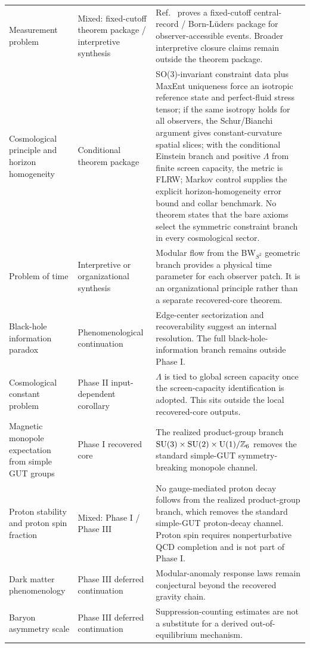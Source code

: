 \begin{longtable}{p{} p{} p{}}
Measurement problem & Mixed: fixed-cutoff theorem package / interpretive synthesis & Ref.~\cite{ophmicrophysics} proves a fixed-cutoff central-record / Born-L\"uders package for observer-accessible events. Broader interpretive closure claims remain outside the theorem package. \\
Cosmological principle and horizon homogeneity & Conditional theorem package & SO(3)-invariant constraint data plus MaxEnt uniqueness force an isotropic reference state and perfect-fluid stress tensor; if the same isotropy holds for all observers, the Schur/Bianchi argument gives constant-curvature spatial slices; with the conditional Einstein branch and positive \(\Lambda\) from finite screen capacity, the metric is FLRW; Markov control supplies the explicit horizon-homogeneity error bound and collar benchmark. No theorem states that the bare axioms select the symmetric constraint branch in every cosmological sector. \\
Problem of time & Interpretive or organizational synthesis & Modular flow from the BW\(_{S^2}\) geometric branch provides a physical time parameter for each observer patch. It is an organizational principle rather than a separate recovered-core theorem. \\
Black-hole information paradox & Phenomenological continuation & Edge-center sectorization and recoverability suggest an internal resolution. The full black-hole-information branch remains outside Phase I. \\
Cosmological constant problem & Phase II input-dependent corollary & \(\Lambda\) is tied to global screen capacity once the screen-capacity identification is adopted. This sits outside the local recovered-core outputs. \\
Magnetic monopole expectation from simple GUT groups & Phase I recovered core & The realized product-group branch \(\mathrm{SU}(3)\times\mathrm{SU}(2)\times\mathrm{U}(1)/\mathbb Z_6\) removes the standard simple-GUT symmetry-breaking monopole channel. \\
Proton stability and proton spin fraction & Mixed: Phase I / Phase III & No gauge-mediated proton decay follows from the realized product-group branch, which removes the standard simple-GUT proton-decay channel. Proton spin requires nonperturbative QCD completion and is not part of Phase I. \\
Dark matter phenomenology & Phase III deferred continuation & Modular-anomaly response laws remain conjectural beyond the recovered gravity chain. \\
Baryon asymmetry scale & Phase III deferred continuation & Suppression-counting estimates are not a substitute for a derived out-of-equilibrium mechanism. \\

\end{longtable}
